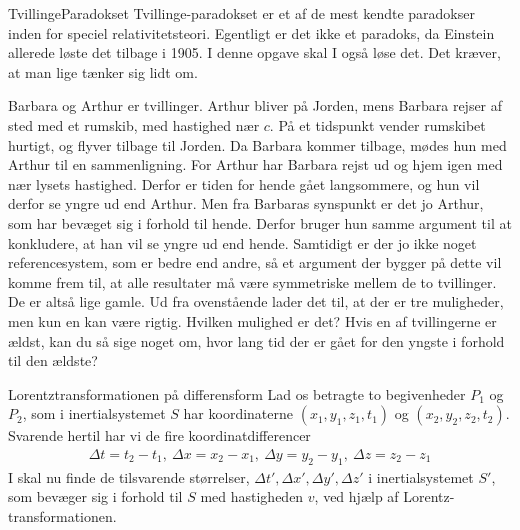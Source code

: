 \documentclass[crop=false, class=memoir]{standalone}
\begin{document}
\begin{opgave}[2]{TvillingeParadokset}
	Tvillinge-paradokset er et af de mest kendte paradokser inden for speciel relativitetsteori. Egentligt er det ikke
	et paradoks, da Einstein allerede løste det tilbage i 1905. I denne opgave skal I også løse det. Det kræver, at man
	lige tænker sig lidt om.
	
	Barbara og Arthur er tvillinger. Arthur bliver på Jorden, mens Barbara rejser af sted med et rumskib, med
	hastighed nær $c$. På et tidspunkt vender rumskibet hurtigt, og flyver tilbage til Jorden. Da Barbara kommer
	tilbage, mødes hun med Arthur til en sammenligning. For Arthur har Barbara rejst ud og hjem igen med nær
	lysets hastighed. Derfor er tiden for hende gået langsommere, og hun vil derfor se yngre ud end Arthur. Men
	fra Barbaras synspunkt er det jo Arthur, som har bevæget sig i forhold til hende. Derfor bruger hun samme
	argument til at konkludere, at han vil se yngre ud end hende. Samtidigt er der jo ikke noget referencesystem,
	som er bedre end andre, så et argument der bygger på dette vil komme frem til, at alle resultater må være
	symmetriske mellem de to tvillinger. De er altså lige gamle.
	\opg Ud fra ovenstående lader det til, at der er tre muligheder, men kun en kan være rigtig. Hvilken mulighed
	er det?
	\opg Hvis en af tvillingerne er ældst, kan du så sige noget om, hvor lang tid der er gået for den yngste i
	forhold til den ældste?
\end{opgave}


\begin{opgave}[2]{Lorentztransformationen på differensform} \label{rel:opg:lorentz_diff}%
	Lad os betragte to begivenheder $P_1$ og $P_2$, som i inertialsystemet $S$ har koordinaterne $(x_1,y_1,z_1,t_1)$ og $(x_2,y_2,z_2,t_2)$. Svarende hertil har vi de fire koordinatdifferencer
	\begin{align}
		\Delta t=t_2-t_1, \	 \Delta x=x_2-x_1, \ \Delta y=y_2-y_1, \ \Delta z= z_2-z_1 \nonumber
	\end{align}
	\opg I skal nu finde de tilsvarende størrelser,
	\begin{math}
		\Delta t',  \Delta x',  \Delta y',  \Delta z'
	\end{math}
	i inertialsystemet $S'$, som bevæger sig i forhold til $S$ med hastigheden $v$, ved hjælp af Lorentz-transformationen.
\end{opgave}
\end{document}
